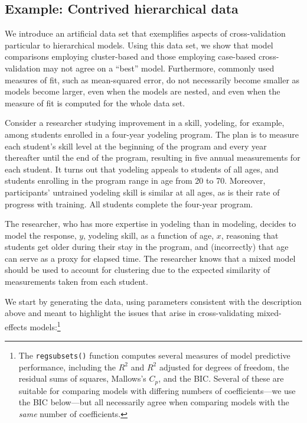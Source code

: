 \documentclass[
]{jss}
\begin{document}
\hypertarget{example-contrived-hierarchical-data}{%
\subsection{Example: Contrived hierarchical
data}\label{example-contrived-hierarchical-data}}

We introduce an artificial data set that exemplifies aspects of
cross-validation particular to hierarchical models. Using this data set,
we show that model comparisons employing cluster-based and those
employing case-based cross-validation may not agree on a ``best'' model.
Furthermore, commonly used measures of fit, such as mean-squared error,
do not necessarily become smaller as models become larger, even when the
models are nested, and even when the measure of fit is computed for the
whole data set.

Consider a researcher studying improvement in a skill, yodeling, for
example, among students enrolled in a four-year yodeling program. The
plan is to measure each student's skill level at the beginning of the
program and every year thereafter until the end of the program,
resulting in five annual measurements for each student. It turns out
that yodeling appeals to students of all ages, and students enrolling in
the program range in age from 20 to 70. Moreover, participants'
untrained yodeling skill is similar at all ages, as is their rate of
progress with training. All students complete the four-year program.

The researcher, who has more expertise in yodeling than in modeling,
decides to model the response, \(y\), yodeling skill, as a function of
age, \(x\), reasoning that students get older during their stay in the
program, and (incorrectly) that age can serve as a proxy for elapsed
time. The researcher knows that a mixed model should be used to account
for clustering due to the expected similarity of measurements taken from
each student.

We start by generating the data, using parameters consistent with the
description above and meant to highlight the issues that arise in
cross-validating mixed-effects models:\footnote{The
  \texttt{regsubsets()} function computes several measures of model
  predictive performance, including the \(R^2\) and \(R^2\) adjusted for
  degrees of freedom, the residual sums of squares, Mallows's \(C_p\),
  and the BIC. Several of these are suitable for comparing models with
  differing numbers of coefficients---we use the BIC below---but all
  necessarily agree when comparing models with the \emph{same} number of
  coefficients.}
\end{document}
